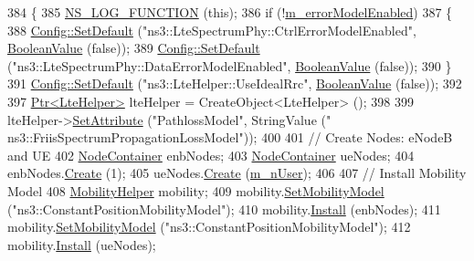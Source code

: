 \begin{DoxyCode}
384 \{
385   \hyperlink{log-macros-disabled_8h_a90b90d5bad1f39cb1b64923ea94c0761}{NS\_LOG\_FUNCTION} (\textcolor{keyword}{this});
386   \textcolor{keywordflow}{if} (!\hyperlink{classLenaPfFfMacSchedulerTestCase2_a5c5c82104effa24452b35b7da0eda70e}{m\_errorModelEnabled})
387     \{
388       \hyperlink{group__config_ga2e7882df849d8ba4aaad31c934c40c06}{Config::SetDefault} (\textcolor{stringliteral}{"ns3::LteSpectrumPhy::CtrlErrorModelEnabled"}, 
      \hyperlink{classns3_1_1BooleanValue}{BooleanValue} (\textcolor{keyword}{false}));
389       \hyperlink{group__config_ga2e7882df849d8ba4aaad31c934c40c06}{Config::SetDefault} (\textcolor{stringliteral}{"ns3::LteSpectrumPhy::DataErrorModelEnabled"}, 
      \hyperlink{classns3_1_1BooleanValue}{BooleanValue} (\textcolor{keyword}{false}));
390     \}
391   \hyperlink{group__config_ga2e7882df849d8ba4aaad31c934c40c06}{Config::SetDefault} (\textcolor{stringliteral}{"ns3::LteHelper::UseIdealRrc"}, 
      \hyperlink{classns3_1_1BooleanValue}{BooleanValue} (\textcolor{keyword}{false}));
392 
397   \hyperlink{classns3_1_1Ptr}{Ptr<LteHelper>} lteHelper = CreateObject<LteHelper> ();
398   
399   lteHelper->\hyperlink{classns3_1_1ObjectBase_ac60245d3ea4123bbc9b1d391f1f6592f}{SetAttribute} (\textcolor{stringliteral}{"PathlossModel"}, StringValue (\textcolor{stringliteral}{"
      ns3::FriisSpectrumPropagationLossModel"}));
400 
401   \textcolor{comment}{// Create Nodes: eNodeB and UE}
402   \hyperlink{classns3_1_1NodeContainer}{NodeContainer} enbNodes;
403   \hyperlink{classns3_1_1NodeContainer}{NodeContainer} ueNodes;
404   enbNodes.\hyperlink{classns3_1_1NodeContainer_a787f059e2813e8b951cc6914d11dfe69}{Create} (1);
405   ueNodes.\hyperlink{classns3_1_1NodeContainer_a787f059e2813e8b951cc6914d11dfe69}{Create} (\hyperlink{classLenaPfFfMacSchedulerTestCase2_a48ae704964f6973d4c7a957cb7d673da}{m\_nUser});
406 
407   \textcolor{comment}{// Install Mobility Model}
408   \hyperlink{classns3_1_1MobilityHelper}{MobilityHelper} mobility;
409   mobility.\hyperlink{classns3_1_1MobilityHelper_a030275011b6f40682e70534d30280aba}{SetMobilityModel} (\textcolor{stringliteral}{"ns3::ConstantPositionMobilityModel"});
410   mobility.\hyperlink{classns3_1_1MobilityHelper_a07737960ee95c0777109cf2994dd97ae}{Install} (enbNodes);
411   mobility.\hyperlink{classns3_1_1MobilityHelper_a030275011b6f40682e70534d30280aba}{SetMobilityModel} (\textcolor{stringliteral}{"ns3::ConstantPositionMobilityModel"});
412   mobility.\hyperlink{classns3_1_1MobilityHelper_a07737960ee95c0777109cf2994dd97ae}{Install} (ueNodes);

\end{DoxyCode}
